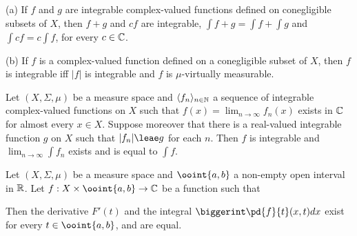 (a) If $f$ and $g$ are integrable 
complex-valued functions defined 
on conegligible subsets of $X$, then $f+g$ and $cf$ are integrable, 
$\int f+g=\int f+\int g$ and $\int cf=c\int f$, for 
every $c\in\Bbb C$.
      
{(b)} If $f$ is a complex-valued function defined on a conegligible 
subset of $X$, then $f$ is integrable iff $|f|$ is integrable and $f$ is 
$\mu$-virtually measurable. 
      
      
 Let 
$(X,\Sigma,\mu)$ 
be a measure space and $\langle f_n\rangle_{n\in\Bbb N}$ a sequence of 
integrable complex-valued functions on $X$ such that 
$f(x)=\lim_{n\to\infty}f_n(x)$ 
exists in $\Bbb C$ for almost every $x\in X$.   Suppose moreover that 
there is a real-valued 
integrable function $g$ on $X$ such that $|f_n|\leae g$ for each 
$n$.   Then $f$ is integrable and $\lim_{n\to\infty}\int f_n$ exists and is equal to $\int f$. 
      
      
 Let $(X,\Sigma,\mu)$ be a measure space and 
$\ooint{a,b}$ a non-empty open interval in $\Bbb R$.   Let 
$f:X\times\ooint{a,b}\to\Bbb C$ be a function such that 
      
      
      
      
\noindent Then the derivative $F'(t)$ and the integral 
$\biggerint\pd{f}{t}(x,t)dx$ exist for every $t\in\ooint{a,b}$, 
and are equal. 
      
      
